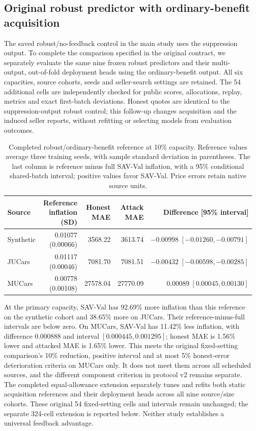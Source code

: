 \subsection{Original robust predictor with ordinary-benefit acquisition}
The saved robust/no-feedback control in the main study uses the suppression
output. To complete the comparison specified in the original contract, we
separately evaluate the same nine frozen robust predictors and their
multi-output, out-of-fold deployment heads using the ordinary-benefit
output. All six capacities, source cohorts, seeds and seller-search settings
are retained. The 54 additional cells are independently checked for public
scores, allocations, replay, metrics and exact first-batch deviations.
Honest quotes are identical to the suppression-output robust control;
this follow-up changes acquisition and the induced seller reports, without
refitting or selecting models from evaluation outcomes.

\begin{table}[t]
\centering
\caption{Completed robust/ordinary-benefit reference at 10\% capacity.
Reference values average three training seeds, with sample standard deviation
in parentheses. The last column is reference minus full SAV-Val inflation,
with a 95\% conditional shared-batch interval; positive values favor SAV-Val.
Price errors retain native source units.}
\label{tab:robust_benefit_reference}
\begin{tabular}{lrrrr}
\toprule
Source & Reference inflation (SD) & Honest MAE & Attack MAE & Difference [95\% interval]\\
\midrule
Synthetic & 0.01077 (0.00066) & 3568.22 & 3613.74 & $-0.00998\;[-0.01260,-0.00791]$\\
JUCars & 0.01117 (0.00046) & 7081.70 & 7081.51 & $-0.00432\;[-0.00598,-0.00285]$\\
MUCars & 0.00778 (0.00108) & 27578.04 & 27770.09 & $0.00089\;[0.00045,0.00130]$\\
\bottomrule
\end{tabular}
\end{table}

At the primary capacity, SAV-Val has 92.69\% more inflation than this
reference on the synthetic cohort and 38.65\% more on JUCars. Their
reference-minus-full intervals are below zero. On MUCars, SAV-Val has
11.42\% less inflation, with difference $0.000888$ and interval
$[0.000445,0.001295]$; honest MAE is 1.56\% lower and attacked MAE
is 1.65\% lower. This meets the original fixed-setting comparison's
10\% reduction, positive interval and at most 5\% honest-error deterioration
criteria on MUCars only. It does not meet them across all scheduled sources,
and the different component criterion in protocol v2 remains separate.
The completed equal-allowance extension separately tunes and refits both
static acquisition references and their deployment heads across all nine
source/size cohorts. These original 54 fixed-setting cells and intervals remain
unchanged; the separate 324-cell extension is reported below. Neither study
establishes a universal feedback advantage.

